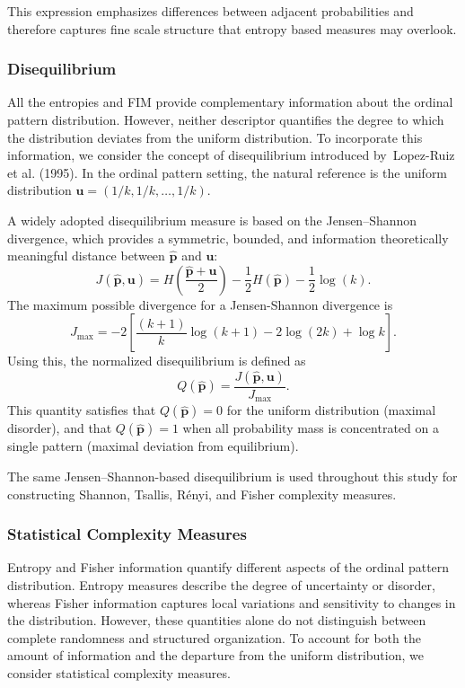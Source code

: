 \documentclass[12pt,a4paper]{article}
\begin{document}
This expression emphasizes differences between adjacent probabilities and therefore captures fine scale structure that entropy based measures may overlook.

\subsubsection{Disequilibrium}\label{disequilibrium}

All the entropies and FIM provide complementary information about the ordinal pattern distribution. However, neither descriptor quantifies the  degree to which the distribution deviates from the uniform distribution.
To incorporate this information, we consider the concept of disequilibrium introduced by~Lopez-Ruiz et al. (1995). In the ordinal pattern setting, the natural reference is the uniform distribution \(\mathbf{u}=(1/k,1/k,\ldots,1/k)\).

A widely adopted disequilibrium measure is based on the Jensen--Shannon divergence, which provides a symmetric, bounded, and information theoretically meaningful distance between \(\widehat{\mathbf{p}}\) and \(\mathbf{u}\): 
\[
J(\widehat{\mathbf{p}},\mathbf{u})
= H\!\left(\frac{\widehat{\mathbf{p}}+\mathbf{u}}{2}\right)
- \frac{1}{2}H(\widehat{\mathbf{p}})
- \frac{1}{2}\log(k).
\] 
The maximum possible divergence for a Jensen-Shannon divergence is 
\[
J_{\max}
= -2\left[\frac{(k+1)}{k}\log(k+1) - 2\log(2k) + \log k\right].
\] 
Using this, the normalized disequilibrium is defined as 
\[
Q(\widehat{\mathbf{p}}) = \frac{J(\widehat{\mathbf{p}},\mathbf{u})}{J_{\max}}.
\] 
This quantity satisfies that \(Q(\widehat{\mathbf{p}}) = 0\) for the uniform distribution (maximal disorder), and that \(Q(\widehat{\mathbf{p}}) = 1\) when all probability mass is concentrated on a single pattern (maximal deviation from equilibrium).

The same Jensen--Shannon-based disequilibrium is used throughout this study for constructing Shannon, Tsallis, Rényi, and Fisher complexity measures.

\subsubsection{Statistical Complexity Measures}
\label{complexity-measures}

Entropy and Fisher information quantify different aspects of the ordinal pattern distribution. Entropy measures describe the degree of uncertainty or disorder, whereas Fisher information captures local variations and sensitivity to changes in the distribution. However, these quantities
alone do not distinguish between complete randomness and structured organization. To account for both the amount of information and the departure from the uniform distribution, we consider statistical complexity measures.
\end{document}

